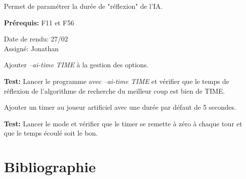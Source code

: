 \documentclass{article}
\begin{document}
\begin{needbox}
    Permet de paramétrer la durée de "réflexion" de l'IA.

    \textbf{Prérequis:} F11 et F56
    \begin{duedatebox}
        Date de rendu: 27/02\\
        Assigné: Jonathan
    \end{duedatebox}
    \begin{subneedbox}
        Ajouter \textit{--ai-time TIME} à la gestion des options.

        \textbf{Test:} Lancer le programme avec \textit{--ai-time TIME} et vérifier que
        le temps de réflexion de l'algorithme de recherche du meilleur coup est bien de TIME.
    \end{subneedbox}
    \begin{subneedbox}
        Ajouter un timer au joueur artificiel avec une durée par défaut de 5 secondes.

        \textbf{Test:} Lancer le mode et vérifier que le timer se remette à zéro à chaque tour et que le temps écoulé soit le bon.
    \end{subneedbox}
\end{needbox}


\pagebreak
\section{Bibliographie}


\end{document}
